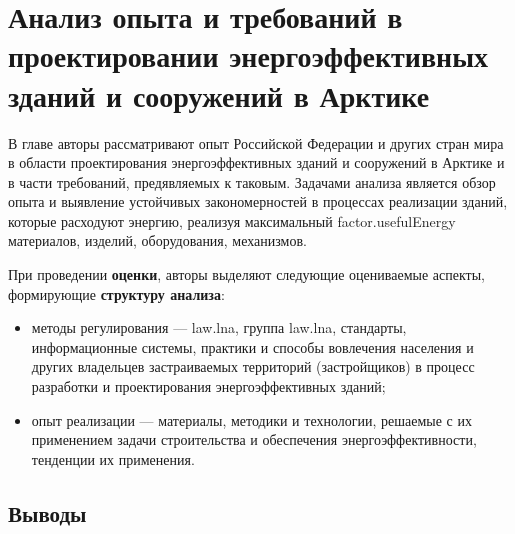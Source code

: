 \chapter{Анализ опыта и требований в проектировании энергоэффективных зданий и сооружений в Арктике}
В главе авторы рассматривают опыт Российской Федерации и других стран мира в области проектирования энергоэффективных зданий и сооружений в Арктике и в части требований, предявляемых к таковым.
Задачами анализа является обзор опыта и выявление устойчивых закономерностей в процессах реализации зданий, которые расходуют энергию, реализуя максимальный \gls{factor.usefulEnergy} материалов, изделий, оборудования, механизмов.

При проведении \textbf{оценки}, авторы выделяют следующие оцениваемые аспекты, формирующие \textbf{структуру анализа}:
\begin{itemize}
    \item методы регулирования --- \gls{law.lna}, группа \gls{law.lna}, стандарты, информационные системы,
    практики и способы вовлечения населения и других владельцев застраиваемых территорий (застройщиков) в процесс разработки и проектирования энергоэффективных зданий;
    \item опыт реализации --- материалы, методики и технологии, решаемые с их применением задачи строительства и обеспечения энергоэффективности, тенденции их применения. %
\end{itemize}


\providecommand{\scAssesmentHeader}[1]
{\textbf{Оценка опыта и требований в проектировании энергоэффективных зданий #1}}
\providecommand{\scAssesmentBuildingClass}{Модельные классы застройки}
\providecommand{\scAssesmentBuildingMetrics}{Модельные метрики потребления энергии}
\providecommand{\scAssesmentExp}{Опыт реализации зданий}
\providecommand{\scAssesmentBuildingLaw}{Методы регулирования}







\section{\textbf{Выводы}}

